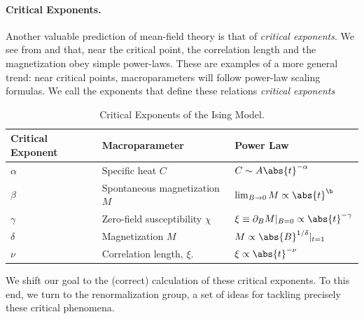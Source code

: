 \paragraph{Critical Exponents.} Another valuable prediction of
mean-field theory is that of \textit{critical exponents}. We see from
 and  that,
near the critical point, the correlation length and the magnetization
obey simple power-laws. These are examples of a more general trend:
near critical points, macroparameters will follow power-law scaling
formulas. We call the exponents that define these relations
\textit{critical exponents} 

\begin{table}
  \begin{center}\label{tab:crit-exponents}
    \caption{Critical Exponents of the Ising Model.}
  \begin{tabular}{lll}
    \toprule
    Critical Exponent & Macroparameter & Power Law\\
    \midrule
    $\alpha$ & Specific heat $C$ & $C\sim A \abs{t}^{-\alpha}$\\
    $\beta$ & Spontaneous magnetization $M$ & $\lim_{B\rightarrow 0}M\propto \abs{t}^\b$\\
    $\gamma$ & Zero-field susceptibility $\chi$ & $\xi\equiv\partial_B M\rvert_{B=0}\propto \abs{t}^{-\gamma}$\\
    $\delta$ & Magnetization $M$ & $M \propto \abs{B}^{1/\delta}\rvert_{t=1}$\\
    $\nu$ & Correlation length, $\xi$. & $\xi\propto\abs{t}^{-\nu}$\\
    \bottomrule
  \end{tabular}
\end{center}
\end{table}

We shift our goal to the (correct) calculation of these critical
exponents. To this end, we turn to the renormalization group, a set of
ideas for tackling precisely these critical phenomena.

